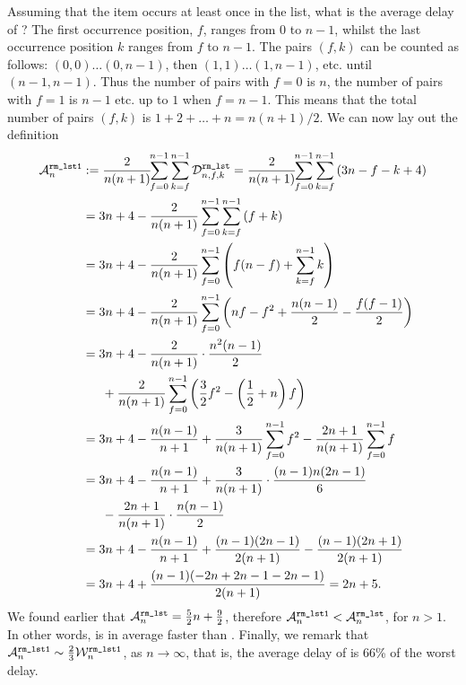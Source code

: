Assuming that the item occurs at least once in the list, what is the
average delay of ? The first occurrence position,
\(f\), ranges from \(0\) to \(n-1\), whilst the last occurrence
position \(k\) ranges from \(f\) to \(n-1\). The pairs \((f,k)\) can
be counted as follows: \((0,0) \dots (0,n-1)\), then \((1,1) \dots
(1,n-1)\), etc. until \((n-1,n-1)\). Thus the number of pairs with
\(f=0\) is \(n\), the number of pairs with \(f=1\) is \(n-1\) etc. up
to \(1\) when \(f=n-1\). This means that the total number of pairs
\((f,k)\) is \(1 + 2 + \dots + n = n(n+1)/2\). We can now lay out the
definition
\begin{align*}
\ave{rm\_lst1}{n}
  &:=
     \frac{2}{n(n+1)}\!\!\sum_{f=0}^{n-1}\sum_{k=f}^{n-1}{\comp{rm\_lst}{n,f,k}}
   = \frac{2}{n(n+1)}\!\!\sum_{f=0}^{n-1}\sum_{k=f}^{n-1}{(3n - f - k +
     4)}\\
  &= 3n + 4 - \frac{2}{n(n+1)}\sum_{f=0}^{n-1}\sum_{k=f}^{n-1}{(f+k)}\\
  &= 3n + 4
     - \frac{2}{n(n+1)}\sum_{f=0}^{n-1}\left(f(n-f) +
     \sum_{k=f}^{n-1}{k}\right)\\
  &= 3n + 4 - \frac{2}{n(n+1)}\sum_{f=0}^{n-1}\left(nf-f^2 +
     \frac{n(n-1)}{2} - \frac{f(f-1)}{2}\right)\\
  &= 3n + 4 - \frac{2}{n(n+1)} \cdot \frac{n^2(n-1)}{2}\\
  &\phantom{= 3}
     + \frac{2}{n(n+1)}\sum_{f=0}^{n-1}\left(\frac{3}{2}f^2
                               -\left(\frac{1}{2} + n\right)f\right)\\
  &= 3n + 4 - \frac{n(n-1)}{n+1} +
                               \frac{3}{n(n+1)}\sum_{f=0}^{n-1}{f^2}
   - \frac{2n+1}{n(n+1)}\sum_{f=0}^{n-1}{f}\\
  &= 3n + 4 - \frac{n(n-1)}{n+1} +
     \frac{3}{n(n+1)}\cdot\frac{(n-1)n(2n-1)}{6}\\
  &\phantom{= 3}
     - \frac{2n+1}{n(n+1)} \cdot \frac{n(n-1)}{2}\\
  &= 3n + 4 - \frac{n(n-1)}{n+1} + \frac{(n-1)(2n-1)}{2(n+1)}
     - \frac{(n-1)(2n+1)}{2(n+1)}\\
  &= 3n + 4 + \frac{(n-1)(-2n+2n-1-2n-1)}{2(n+1)}
   = 2n + 5.
\end{align*}
We found earlier that \(\ave{rm\_lst}{n} = \tfrac{5}{2}n +
\tfrac{9}{2}\), therefore \(\ave{rm\_lst1}{n} < \ave{rm\_lst}{n}\),
for \(n > 1\). In other words,  is in average
faster than . Finally, we remark that
\(\ave{rm\_lst1}{n} \mathrel{\sim} \tfrac{2}{3}\worst{rm\_lst1}{n}\),
as \(n \rightarrow \infty\), that is, the average delay of
 is 66\% of the worst delay.

